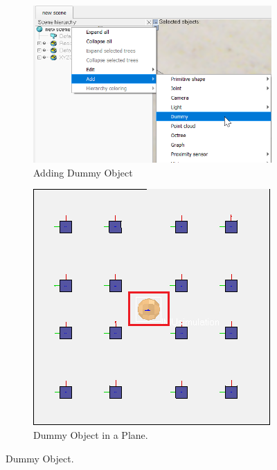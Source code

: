 \begin{figure}[h!]
  \centering
  \begin{subfigure}[b]{0.4\linewidth}
    \includegraphics[width=\linewidth]{figures/addingDummyObject.png}
    \caption{Adding Dummy Object }
  \end{subfigure}
\quad
\begin{subfigure}[b]{0.4\linewidth}
    \includegraphics[width=\linewidth]{figures/DummyObjectinaPlane.png}
    \caption{Dummy Object in a Plane.}
  \end{subfigure}
 \caption{Dummy Object.}
  \label{fig:Dummy_object}
\end{figure}

